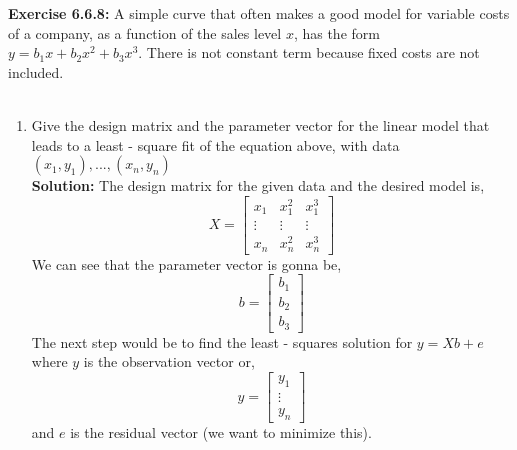 \documentclass{amsart}
\begin{document}
\noindent\textbf{Exercise 6.6.8: }A simple curve that often makes a good model for variable costs of a company, as a function of the sales level $x$, has the form $y = b_1x + b_2x^2 + b_3x^3$. There is not constant term because fixed costs are not included.\\\\
\begin{enumerate}

\item Give the design matrix and the parameter vector for the linear model that leads to a least - square fit of the equation above, with data $(x_1,y_1),...,(x_n,y_n)$\\
\noindent \textbf{Solution: } The design matrix for the given data and the desired model is,
\begin{equation*}
X = 
\begin{bmatrix} 
   x_{1} & x_{1}^2 & x_{1}^3\\
    \vdots & \vdots &   \vdots\\
    x_{n} &   x_{n}^2  &  x_{n}^3
    \end{bmatrix}
\end{equation*}
We can see that the parameter vector is gonna be,
\begin{equation*}
b = 
\begin{bmatrix}
 b_1 \\
  b_2  \\
b_3 
\end{bmatrix}
\end{equation*}
The next step would be to find the least - squares solution for $y = Xb + e$ where $y$ is the observation vector or,
\begin{equation*}
y = 
\begin{bmatrix}
 y_1 \\
  \vdots \\
y_n 
\end{bmatrix}
\end{equation*}
and $e$ is the residual vector (we want to minimize this).
\vspace{1in}



\end{enumerate}
\end{document}

